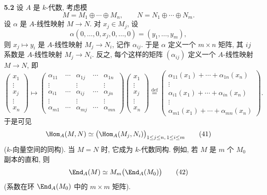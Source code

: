\noindent\textbf{5.2} 设 $A$ 是 $k$-代数, 考虑模
\[
M=M_{1}\oplus\cdots\oplus M_{n},\qquad
N=N_{1}\oplus\cdots\oplus N_{m}.
\]
设 $\alpha$ 是 $A$-线性映射 $M\to N$. 对 $x_j\in M_j$, 设
\[
\alpha(0,\ldots,0,x_{j},0,\ldots,0)=(y_{1},\ldots,y_{m}),
\]
则 $x_j\mapsto y_i$ 是 $A$-线性映射 $M_j\to N_i$, 记作 $\alpha_{ij}$. 于是 $\alpha$ 定义一个 $m\times n$ 矩阵, 其 $ij$ 系数是 $A$-线性映射 $M_j\to N_i$. 反之, 每个这样的矩阵 $(\alpha_{ij})$ 定义一个 $A$-线性映射 $M\to N$, 即
\[
\begin{pmatrix}x_{1}\\ \vdots\\ x_{j}\\ \vdots\\ x_{n}\end{pmatrix}\mapsto
\begin{pmatrix}\alpha_{11}&\cdots&\alpha_{1j}&\cdots&\alpha_{1n}\\ \vdots&&\vdots&&\vdots\\ \alpha_{i1}&\cdots&\alpha_{ij}&\cdots&\alpha_{jn}\\ \vdots&&\vdots&&\vdots\\ \alpha_{m1}&\cdots&\alpha_{mj}&\cdots&\alpha_{mn}\end{pmatrix}
\begin{pmatrix}x_{1}\\ \vdots\\ x_{j}\\ \vdots\\ x_{n}\end{pmatrix}
\stackrel{\mathrm{def}}{=}
\begin{pmatrix}\alpha_{11}(x_{1})+\cdots+\alpha_{1n}(x_{n})\\ \vdots\\ \alpha_{i1}(x_{1})+\cdots+\alpha_{in}(x_{n})\\ \vdots\\ \alpha_{m1}(x_{1})+\cdots+\alpha_{mn}(x_{n})\end{pmatrix}.
\]
于是可见
\begin{equation}
\Hom_{A}(M,N)\simeq\bigl(\Hom_{A}(M_{j},N_{i})\bigr)_{1\le j\le n,\,1\le i\le m}\tag{41}
\end{equation}
($k$-向量空间的同构). 当 $M=N$ 时, 它成为 $k$-代数同构. 例如, 若 $M$ 是 $m$ 个 $M_0$ 副本的直和, 则
\begin{equation}
\End_{A}(M)\simeq M_{m}\bigl(\End_{A}(M_{0})\bigr)\tag{42}
\end{equation}
(系数在环 $\End_A(M_0)$ 中的 $m\times m$ 矩阵).

\setcounter{theorem}{2} %

